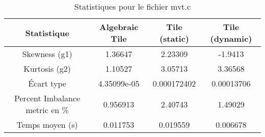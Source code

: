 \documentclass{article}
\begin{document}
\begin{table}[htbp]
  \centering
  \caption{Statistiques pour le fichier mvt.c}
  \begin{tabular}{|c|c|c|c|}
    \hline
    Statistique & Algebraic Tile & Tile (static) & Tile (dynamic) \\ 
    \hline
    Skewness (g1) & 1.36647 & 2.23309 & -1.9413 \\ 
    Kurtosis (g2) & 1.10527 & 3.05713 & 3.36568 \\ 
    Écart type & 4.35099e-05 & 0.000172402 & 0.00013706\\ 
    Percent Imbalance metric en \% & 0.956913 & 2.40743 & 1.49029\\ 
    Temps moyen (s) & 0.011753 & 0.019559 & 0.006678 \\ 
    \hline
  \end{tabular}
\end{table}
\newpage

  
\end{document}
